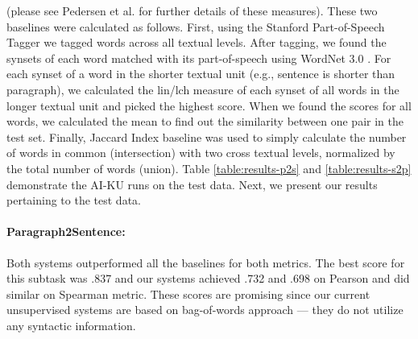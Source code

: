 \documentclass[11pt]{article}
\begin{document}
(please see Pedersen et al.  for further details of these measures). These two baselines were calculated as follows. First, using the Stanford Part-of-Speech Tagger \cite{toutanova2000enriching} we tagged words across all textual levels. After tagging, we found the synsets of each word matched with its part-of-speech using WordNet 3.0 \cite{fellbaum98electronic}. For each synset of a word in the shorter textual unit (e.g., sentence is shorter than paragraph), we calculated the lin/lch measure of each synset of all words in the longer textual unit and picked the highest score. When we found the scores for all words, we calculated 
the mean to find out the similarity between one pair in the test set. Finally, Jaccard Index baseline was used to simply 
calculate the number of words in common (intersection) with two cross textual levels, normalized by the total number of words (union). Table \ref{table:results-p2s} and \ref{table:results-s2p} demonstrate the AI-KU runs on the test data. Next, we present our results pertaining to the test data.

\paragraph{Paragraph2Sentence:} Both systems outperformed all the baselines for both metrics. The best score for this subtask was .837 and our systems achieved .732 and .698 on Pearson and did similar on Spearman metric. These scores are promising since our current unsupervised systems are based on bag-of-words approach --- they do not utilize any syntactic information.

\begin{table}[hr]
\begin{center}
\end{center}
\caption{\label{table:results-s2p} Sentence2phrase subtask scores for the test data.}
\end{table}
\end{document}
